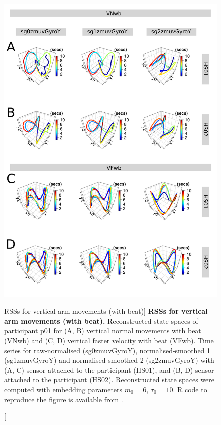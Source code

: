 \begin{figure}
\centering
\includegraphics[height=0.8\textheight]{fig_5_08}
\caption
	[RSSs for vertical arm movements (with beat)]{
	{\bf RSSs for vertical arm movements (with beat).}
	Reconstructed state spaces of participant p01 for 
	(A, B) vertical normal movements with beat (VNwb) and 
	(C, D) vertical faster velocity with beat (VFwb).
	Time series for raw-normalised (sg0zmuvGyroY), 
	normalised-smoothed 1 (sg1zmuvGyroY) and 
	normalised-smoothed 2 (sg2zmuvGyroY) with
	(A, C) sensor attached to the participant (HS01), and
	(B, D) sensor attached to the participant (HS02).	
	Reconstructed state spaces were computed with 
	embedding parameters $\overline{m_0}=6$, $\overline{\tau_0}=10$.
	R code to reproduce the figure is available from \cite{xochicale2018}.
        }
     \label{fig:rss_Vwb_w500}
\end{figure}

